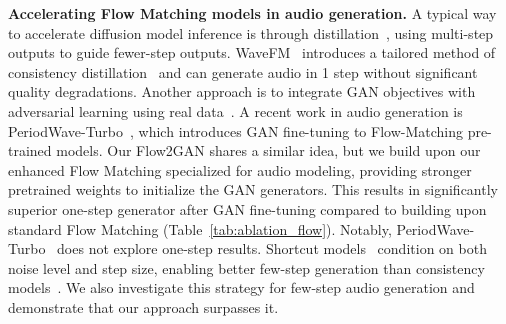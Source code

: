 \noindent\textbf{Accelerating Flow Matching models in audio generation.} A typical way to accelerate diffusion model inference is through distillation~\citep{progressive_distillation,guided_distillation,consistency_model}, using multi-step outputs to guide fewer-step outputs. WaveFM~\citep{wavefm} introduces a tailored method of consistency distillation~\citep{consistency_model} and can generate audio in 1 step without significant quality degradations. 
Another approach is to integrate GAN objectives with adversarial learning using real data~\citep{fastdiff2, periodwave_turbo, revisiting_distillation}. 
A recent work in audio generation is PeriodWave-Turbo~\citep{periodwave_turbo}, which introduces GAN fine-tuning to Flow-Matching pre-trained models. Our Flow2GAN shares a similar idea, but we build upon our enhanced Flow Matching specialized for audio modeling, providing stronger pretrained weights to initialize the GAN generators. This results in significantly superior one-step generator after GAN fine-tuning compared to building upon standard Flow Matching (Table~\ref{tab:ablation_flow}). Notably, PeriodWave-Turbo~\citep{periodwave_turbo} does not explore one-step results. 
Shortcut models~\citep{shortcut} condition on both noise level and step size, enabling better few-step generation than consistency models~\citep{consistency_model}. We also investigate this strategy for few-step audio generation and demonstrate that our approach surpasses it.




